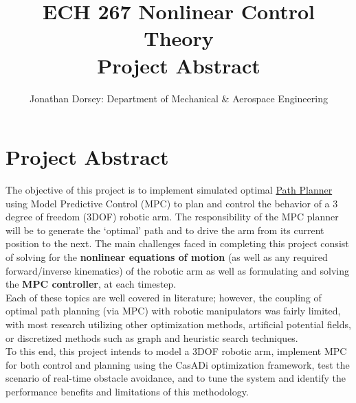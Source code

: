 \documentclass[12px]{article}
\begin{document}
    \title{ECH 267 Nonlinear Control Theory \\ Project Abstract }

    \author{Jonathan Dorsey: Department of Mechanical \& Aerospace Engineering}

    \maketitle


    \section*{Project Abstract}

    \indent The objective of this project is to implement simulated optimal \underline{Path Planner} using Model Predictive Control (MPC) to plan and control the behavior of a 3 degree of freedom (3DOF) robotic arm. The responsibility of the MPC planner will be to generate the `optimal' path and to drive the arm from its current position to the next. The main challenges faced in completing this project consist of solving for the \textbf{nonlinear equations of motion} (as well as any required forward/inverse kinematics) of the robotic arm as well as formulating and solving the \textbf{MPC controller}, at each timestep. \\

     Each of these topics are well covered in literature; however, the coupling of optimal path planning (via MPC) with robotic manipulators was fairly limited, with most research utilizing other optimization methods, artificial potential fields, or discretized methods such as graph and heuristic search techniques. \\

    To this end, this project intends to model a 3DOF robotic arm, implement MPC for both control and planning using the CasADi optimization framework, test the scenario of real-time obstacle avoidance, and to tune the system and identify the performance benefits and limitations of this methodology.
\end{document}
